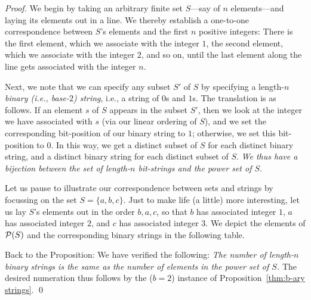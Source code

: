 \begin{proof}
We begin by taking an arbitrary finite set $S$---say of $n$ elements---and laying its elements out in a line.  We thereby establish a one-to-one correspondence between $S$'s elements and the first $n$ positive integers:  There is the first element, which we associate with the integer $1$, the second element, which we associate with the integer $2$, and so on, until the last element along the line gets associated with the integer $n$.

\smallskip

Next, we note that we can specify any subset $S'$ of $S$ by specifying a length-$n$ {\em binary (i.e., base-$2$) string}, i.e., a string of $0$s and $1$s.  The translation is as follows.  If an element $s$ of $S$ appears in the subset $S'$, then we look at the integer we have associated with $s$ (via our linear ordering of $S$), and we set the corresponding bit-position of our binary string to $1$; otherwise, we set this bit-position to $0$.  In this way, we get a distinct subset of $S$ for each distinct binary string, and a distinct binary string for each distinct subset of $S$.  {\em We thus have a {\em bijection} between the set of length-$n$ bit-strings and the power set of $S$.}

\smallskip

Let us pause to illustrate our correspondence between sets and strings by focussing on the set $S = \{a,b,c\}$.  Just to make life (a little) more interesting, let us lay $S$'s elements out in the order $b,a,c$, so that $b$ has associated integer $1$, $a$ has associated integer $2$, and $c$ has associated integer $3$.  We depict the elements of $\mbox{$\cal P$}(S)$ and the corresponding binary strings in the following table.
\begin{center}
\end{center}

Back to the Proposition: We have verified the following: {\em The number of length-$n$ binary strings is the same as the number of elements in the power set of $S$.}  The desired numeration thus follows by the ($b=2$) instance of Proposition~\ref{thm:b-ary strings}.  \qed
\end{proof}

